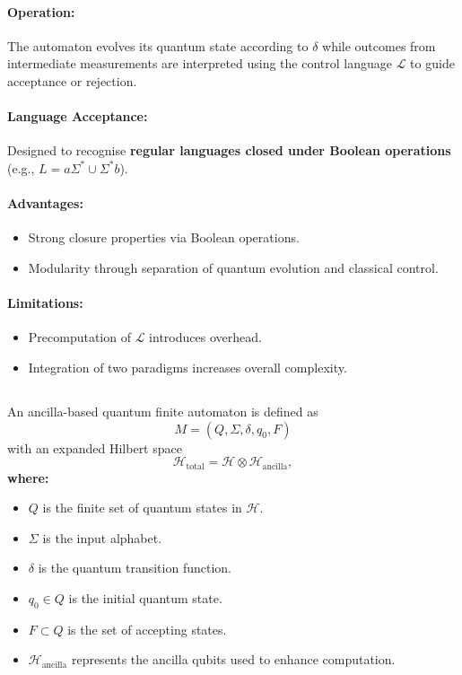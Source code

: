 \paragraph{Operation:}  
The automaton evolves its quantum state according to \( \delta \) while outcomes from intermediate measurements are interpreted using the control language \( \mathcal{L} \) to guide acceptance or rejection.

\paragraph{Language Acceptance:}  
Designed to recognise \textbf{regular languages closed under Boolean operations} (e.g., \( L = a\Sigma^* \cup \Sigma^* b \)).

\paragraph{Advantages:}
\begin{itemize}
    \item Strong closure properties via Boolean operations.
    \item Modularity through separation of quantum evolution and classical control.
\end{itemize}

\paragraph{Limitations:}
\begin{itemize}
    \item Precomputation of \( \mathcal{L} \) introduces overhead.
    \item Integration of two paradigms increases overall complexity.
\end{itemize}

\subsection{}
\label{subsec:a-qfa}
\begin{definition}
An ancilla-based quantum finite automaton is defined as 
\[
M = (Q, \Sigma, \delta, q_0, F)
\]
with an expanded Hilbert space 
\[
\mathcal{H}_{\text{total}} = \mathcal{H} \otimes \mathcal{H}_{\text{ancilla}},
\]
\textbf{where:}
\begin{itemize}
    \item \( Q \) is the finite set of quantum states in \( \mathcal{H} \).
    \item \( \Sigma \) is the input alphabet.
    \item \( \delta \) is the quantum transition function.
    \item \( q_0 \in Q \) is the initial quantum state.
    \item \( F \subset Q \) is the set of accepting states.
    \item \( \mathcal{H}_{\text{ancilla}} \) represents the ancilla qubits used to enhance computation.
\end{itemize}
\end{definition}

